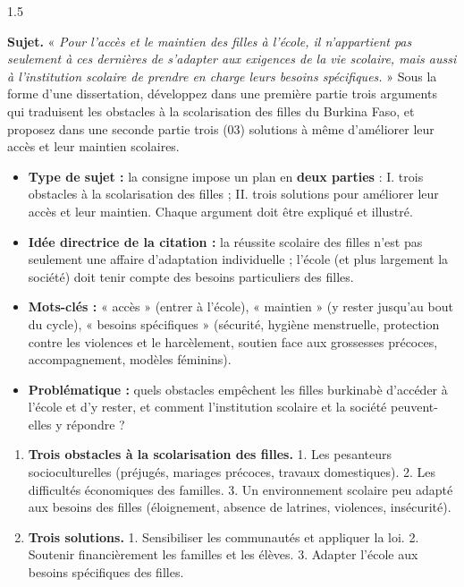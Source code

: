 \documentclass[12pt]{article}
\begin{document}
\begin{spacing}{1.5}

\noindent\textbf{Sujet.} « \emph{Pour l'accès et le maintien des filles à l'école, il n'appartient pas seulement à ces dernières de s'adapter aux exigences de la vie scolaire, mais aussi à l'institution scolaire de prendre en charge leurs besoins spécifiques.} » Sous la forme d'une dissertation, développez dans une première partie trois arguments qui traduisent les obstacles à la scolarisation des filles du Burkina Faso, et proposez dans une seconde partie trois (03) solutions à même d'améliorer leur accès et leur maintien scolaires.



\begin{itemize}
\item \textbf{Type de sujet :} la consigne impose un plan en \textbf{deux parties} : I. trois obstacles à la scolarisation des filles ; II. trois solutions pour améliorer leur accès et leur maintien. Chaque argument doit être expliqué et illustré.
\item \textbf{Idée directrice de la citation :} la réussite scolaire des filles n'est pas seulement une affaire d'adaptation individuelle ; l'école (et plus largement la société) doit tenir compte des besoins particuliers des filles.
\item \textbf{Mots-clés :} « accès » (entrer à l'école), « maintien » (y rester jusqu'au bout du cycle), « besoins spécifiques » (sécurité, hygiène menstruelle, protection contre les violences et le harcèlement, soutien face aux grossesses précoces, accompagnement, modèles féminins).
\item \textbf{Problématique :} quels obstacles empêchent les filles burkinabè d'accéder à l'école et d'y rester, et comment l'institution scolaire et la société peuvent-elles y répondre ?
\end{itemize}


\begin{enumerate}
\item[I.] \textbf{Trois obstacles à la scolarisation des filles.} 1. Les pesanteurs socioculturelles (préjugés, mariages précoces, travaux domestiques). 2. Les difficultés économiques des familles. 3. Un environnement scolaire peu adapté aux besoins des filles (éloignement, absence de latrines, violences, insécurité).
\item[II.] \textbf{Trois solutions.} 1. Sensibiliser les communautés et appliquer la loi. 2. Soutenir financièrement les familles et les élèves. 3. Adapter l'école aux besoins spécifiques des filles.
\end{enumerate}


\end{spacing}
\end{document}

